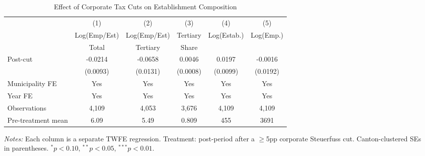 \begin{table}[htbp]
\centering
\caption{Effect of Corporate Tax Cuts on Establishment Composition}
\label{tab:main}
\begin{adjustbox}{max width=\textwidth}
\begin{tabular}{lccccc}
\toprule
& (1) & (2) & (3) & (4) & (5) \\
& Log(Emp/Est) & Log(Emp/Est) & Tertiary & Log(Estab.) & Log(Emp.) \\
& Total & Tertiary & Share &  &  \\
\midrule
Post-cut & -0.0214 & -0.0658 & 0.0046 & 0.0197 & -0.0016 \\
& (0.0093) & (0.0131) & (0.0008) & (0.0099) & (0.0192) \\
\midrule
Municipality FE & Yes & Yes & Yes & Yes & Yes \\
Year FE & Yes & Yes & Yes & Yes & Yes \\
Observations & 4,109 & 4,053 & 3,676 & 4,109 & 4,109 \\
Pre-treatment mean & 6.09 & 5.49 & 0.809 & 455 & 3691 \\
\bottomrule
\end{tabular}
\end{adjustbox}
\begin{tablenotes}[flushleft]
\scriptsize
\item \textit{Notes:} Each column is a separate TWFE regression. Treatment: post-period after a $\geq$5pp corporate Steuerfuss cut. Canton-clustered SEs in parentheses. $^{*}p<0.10$, $^{**}p<0.05$, $^{***}p<0.01$.
\end{tablenotes}
\end{table}
